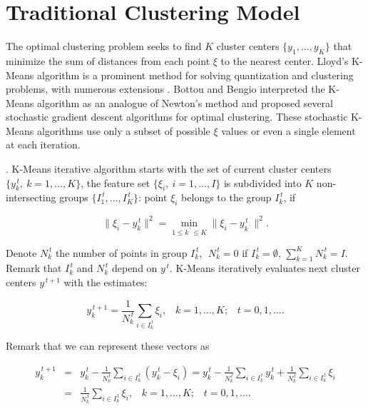 \section{Traditional Clustering Model}

The optimal clustering problem seeks to find $K$ cluster centers $ \{ y_1, ..., y_K \} $ that minimize the sum of distances from each point $ \xi $ to the nearest center. Lloyd's K-Means algorithm \cite{Lloyd_1982} is a prominent method for solving quantization and clustering problems, with numerous extensions \cite{Jain_2010}. Bottou and Bengio \cite{Bottou_1994} interpreted the K-Means algorithm as an analogue of Newton's method and proposed several stochastic gradient descent algorithms for optimal clustering. These stochastic K-Means algorithms use only a subset of possible $ \xi $ values or even a single element at each iteration.

\begin{definition}
    \label{K-Means} \cite{Lloyd_1982}. K-Means iterative algorithm starts with the set of current cluster centers $ \{ y_k^{\,t}, \> k = 1, ..., K \} $, the feature set $ \{ \xi_i, \> i = 1, ..., I \} $ is subdivided into $ K $ non-intersecting groups $ \{ I_1^{\,t}, ..., I_K^{\,t} \} $: point $ \xi_i $ belongs to the group $ I_k^{\,t} $, if

    \begin{equation}
        \label{kmeans-group:eq}
            \| \xi_i - y_k^{\,t} \|^2 = \min_{1 \leq k^{\,\prime} \leq K} \| \xi_i - y_{k^{\,\prime}}^{\,t} \|^2 .
    \end{equation}

    \noindent Denote $ N_k^{\,t} $ the number of points in group $ I_k^{\,t} $, $\; N_k^{\,t} = 0 $ if $ I_k^{\,t} = \emptyset $, $ \sum_{k=1}^K N_k^{\,t} = I $. Remark that $ I_k^{\,t} $ and $ N_k^{\,t} $ depend on $ y^{\,t} $. K-Means iteratively evaluates next cluster centers $ y^{\,t+1} $ with the estimates:

    \begin{equation}
        \label{kmeans-center-estimation:eq}
            y_{k}^{\,t + 1} = \frac{1}{N_k^{\,t}} \sum_{i \in I_k^{\,t}} \xi_i, \;\;\;k = 1, ..., K; \;\;\; t = 0, 1, \ldots.
    \end{equation}

    \noindent Remark that we can represent these vectors as

    \begin{eqnarray}
        \label{kmeans-center-alt:eq}
            y_{k}^{\,t + 1} &=& y_k^{\,t} - \frac{1}{N_k^{\,t}} \sum_{i \in I_k^{\,t}} (y_k^{\,t} - \xi_i) = y_k^{\,t} - \frac{1}{N_k^{\,t}} \sum_{i \in I_k^{\,t}} y_k^{\,t} + \frac{1}{N_k^{\,t}} \sum_{i \in I_k^{\,t}} \xi_i \nonumber \\
            &=& \frac{1}{N_k^{\,t}} \sum_{i \in I_k^{\,t}} \xi_i, \;\;\; k = 1, ..., K; \;\;\; t = 0, 1, \ldots.
    \end{eqnarray}
\end{definition}

